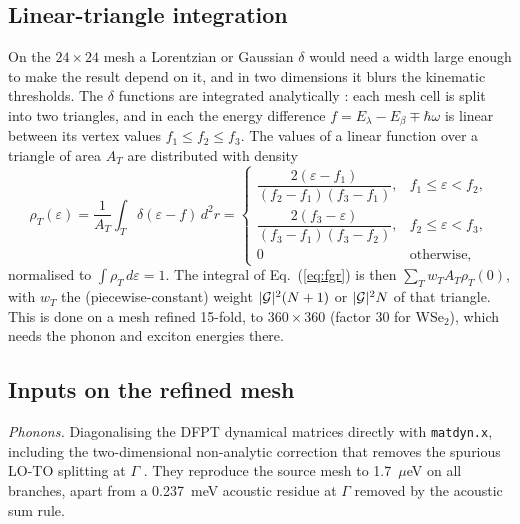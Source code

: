 \subsection{Linear-triangle integration}
On the $24\times24$ mesh a Lorentzian or Gaussian $\delta$ would need a width
large enough to make the result depend on it, and in two dimensions it blurs the
kinematic thresholds. The $\delta$ functions are integrated analytically
\cite{Jepsen1971,Lehmann1972}: each mesh cell is split into two triangles, and in
each the energy difference $f=E_\lambda-E_\beta\mp\hbar\omega$ is linear between
its vertex values $f_1\le f_2\le f_3$. The values of a linear function over a
triangle of area $A_T$ are distributed with density
\begin{equation}
\rho_T(\varepsilon)=\frac{1}{A_T}\int_T\delta(\varepsilon-f)\,d^2r=
\begin{cases}
\dfrac{2(\varepsilon-f_1)}{(f_2-f_1)(f_3-f_1)}, & f_1\le\varepsilon<f_2,\\[1.5ex]
\dfrac{2(f_3-\varepsilon)}{(f_3-f_1)(f_3-f_2)}, & f_2\le\varepsilon<f_3,\\[1ex]
0 & \text{otherwise},
\end{cases}
\end{equation}
normalised to $\int\rho_T\,d\varepsilon=1$. The integral of Eq.~(\ref{eq:fgr}) is
then $\sum_T w_T A_T\rho_T(0)$, with $w_T$ the (piecewise-constant) weight
$|\mathcal{G}|^2(N+1)$ or $|\mathcal{G}|^2N$ of that triangle. This is done on a mesh refined
15-fold, to $360\times360$ (factor 30 for WSe$_2$), which needs the phonon and
exciton energies there.

\subsection{Inputs on the refined mesh}
\emph{Phonons.} Diagonalising the DFPT dynamical matrices directly with
\texttt{matdyn.x}, including the two-dimensional non-analytic correction that
removes the spurious LO-TO splitting at $\Gamma$ \cite{Sohier2017}. They reproduce
the source mesh to 1.7~$\mu$eV on all branches, apart from a 0.237~meV acoustic
residue at $\Gamma$ removed by the acoustic sum rule.


